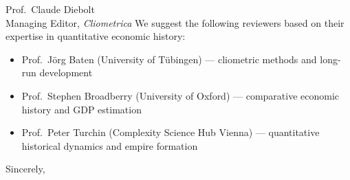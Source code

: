 \documentclass[11pt]{letter}
\begin{document}
\begin{letter}{Prof.\ Claude Diebolt\\Managing Editor, \emph{Cliometrica}}
We suggest the following reviewers based on their expertise in quantitative economic history:
\begin{itemize}
\item Prof.\ J\"org Baten (University of T\"ubingen) --- cliometric methods and long-run development
\item Prof.\ Stephen Broadberry (University of Oxford) --- comparative economic history and GDP estimation
\item Prof.\ Peter Turchin (Complexity Science Hub Vienna) --- quantitative historical dynamics and empire formation
\end{itemize}

\closing{Sincerely,}
\end{letter}
\end{document}
